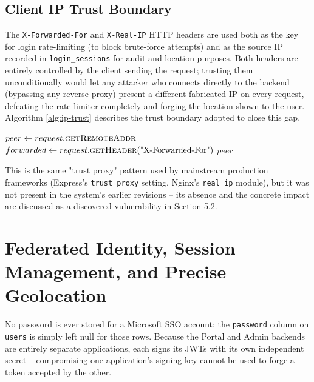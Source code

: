 \documentclass[12pt,a4paper]{report}
\begin{document}
\subsection{Client IP Trust Boundary}

The \texttt{X-Forwarded-For} and \texttt{X-Real-IP} HTTP headers are
used both as the key for login rate-limiting (to block brute-force
attempts) and as the source IP recorded in \texttt{login\_sessions} for
audit and location purposes. Both headers are entirely controlled by
the client sending the request; trusting them unconditionally would let
any attacker who connects directly to the backend (bypassing any
reverse proxy) present a different fabricated IP on every request,
defeating the rate limiter completely and forging the location shown to
the user. Algorithm \ref{alg:ip-trust} describes the trust boundary
adopted to close this gap.

\begin{algorithm}[htbp]
\caption{Trusted-Proxy IP Resolution}
\label{alg:ip-trust}
\begin{algorithmic}[1]
  \State $peer \gets request.\Call{getRemoteAddr}{}$ 
    \State $forwarded \gets request.\Call{getHeader}{\text{"X-Forwarded-For"}}$
      \State \Return {}
    \EndIf
  \EndIf
  \State \Return $peer$ 
\EndProcedure
\end{algorithmic}
\end{algorithm}

This is the same "trust proxy" pattern used by mainstream production
frameworks (Express's \texttt{trust proxy} setting, Nginx's
\texttt{real\_ip} module), but it was not present in the system's
earlier revisions -- its absence and the concrete impact are discussed
as a discovered vulnerability in Section 5.2.

\section{Federated Identity, Session Management, and Precise Geolocation}

No password is ever stored for a Microsoft SSO account; the
\texttt{password} column on \texttt{users} is simply left null for
those rows. Because the Portal and Admin backends are entirely separate
applications, each signs its JWTs with its own independent secret --
compromising one application's signing key cannot be used to forge a
token accepted by the other.
\end{document}
